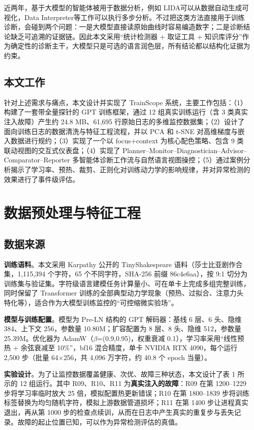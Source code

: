 近两年，基于大模型的智能体被用于数据分析，例如 LIDA\cite{r9}可以从数据自动生成可视化，Data Interpreter\cite{r21}等工作可以执行多步分析。不过把这类方法直接用于训练诊断，会碰到两个问题：一是大模型直接读原始曲线时容易编造数字；二是诊断结论缺乏可追溯的证据链。因此本文采用“统计检测器 + 取证工具 + 知识库评分”作为确定性的诊断主干，大模型只是可选的语言润色层，所有结论都以结构化证据为约束。

\subsection{本文工作}

针对上述需求与痛点，本文设计并实现了 TrainScope 系统，主要工作包括：（1）构建了一套带全量探针的 GPT 训练框架，通过 12 组真实训练运行（含 3 类真实注入故障）产生约 24.8 MB、61,695 行原始日志的多维监控数据集；（2）设计了面向训练日志的数据清洗与特征工程流程，并以 PCA 和 t-SNE 对高维梯度与嵌入数据进行规约；（3）实现了一个以 focus+context 为核心配色策略、包含 9 类联动视图的交互式仪表盘；（4）实现了 Planner–Monitor–Diagnostician–Advisor–Comparator–Reporter 多智能体诊断工作流与自然语言视图操控；（5）通过案例分析揭示了学习率、预热、裁剪、正则化对训练动力学的影响规律，并对异常检测的效果进行了事件级评估。

\section{数据预处理与特征工程}

\subsection{数据来源}

\textbf{训练语料}。本文采用 Karpathy 公开的 TinyShakespeare 语料\cite{r10}（莎士比亚剧作合集，1,115,394 个字符，65 个不同字符，SHA-256 前缀 86c4e6aa），按 9:1 切分为训练集与验证集。字符级语言建模任务计算量小、可在单卡上完成多组完整训练，同时保留了 Transformer 训练的全部典型动力学现象（预热、过拟合、注意力头特化等），适合作为大模型训练监控的“可控缩微实验场”。

\textbf{模型与训练配置}。模型为 Pre-LN 结构的 GPT 解码器\cite{r11}：基线 6 层、6 头、隐维 384、上下文 256，参数量 10.80M；扩容配置为 8 层、8 头、隐维 512，参数量 25.39M。优化器为 AdamW（$\beta$=(0.9,0.95)，权重衰减 0.1），学习率采用“线性预热 + 余弦衰减至 10\%”，bf16 混合精度，单卡 NVIDIA RTX 4090，每个运行 2,500 步（批量 64$\times$256，共 4,096 万字符，约 40.8 个 epoch 当量）。

\textbf{实验设计}。为了让监控数据覆盖健康、次优、故障三种状态，本文设计了表 1 所示的 12 组运行。其中 R09、R10、R11 为\textbf{真实注入的故障}：R09 在第 1200–1229 步将学习率临时放大 25 倍，模拟配置热更新错误；R10 在第 1800–1839 步将训练标签替换为均匀随机字符，模拟上游数据管道损坏；R11 在第 1400 步让进程真实退出，再从第 1000 步的检查点续训，从而在日志中产生真实的重复步与丢失记录。故障的起止位置已知，可以作为异常检测评估的真值。

